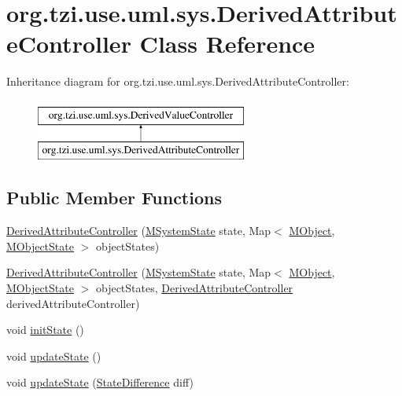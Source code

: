 \hypertarget{classorg_1_1tzi_1_1use_1_1uml_1_1sys_1_1_derived_attribute_controller}{\section{org.\-tzi.\-use.\-uml.\-sys.\-Derived\-Attribute\-Controller Class Reference}
\label{classorg_1_1tzi_1_1use_1_1uml_1_1sys_1_1_derived_attribute_controller}
}
Inheritance diagram for org.\-tzi.\-use.\-uml.\-sys.\-Derived\-Attribute\-Controller\-:\begin{figure}[H]
\begin{center}
\leavevmode
\includegraphics[height=2.000000cm]{classorg_1_1tzi_1_1use_1_1uml_1_1sys_1_1_derived_attribute_controller}
\end{center}
\end{figure}
\subsection*{Public Member Functions}
\begin{DoxyCompactItemize}
\item 
\hyperlink{classorg_1_1tzi_1_1use_1_1uml_1_1sys_1_1_derived_attribute_controller_aaf268d2296b70c626d8748aba489ce50}{Derived\-Attribute\-Controller} (\hyperlink{classorg_1_1tzi_1_1use_1_1uml_1_1sys_1_1_m_system_state}{M\-System\-State} state, Map$<$ \hyperlink{interfaceorg_1_1tzi_1_1use_1_1uml_1_1sys_1_1_m_object}{M\-Object}, \hyperlink{classorg_1_1tzi_1_1use_1_1uml_1_1sys_1_1_m_object_state}{M\-Object\-State} $>$ object\-States)
\item 
\hyperlink{classorg_1_1tzi_1_1use_1_1uml_1_1sys_1_1_derived_attribute_controller_a14d09fa0eb643e2de38cd729c9b67a65}{Derived\-Attribute\-Controller} (\hyperlink{classorg_1_1tzi_1_1use_1_1uml_1_1sys_1_1_m_system_state}{M\-System\-State} state, Map$<$ \hyperlink{interfaceorg_1_1tzi_1_1use_1_1uml_1_1sys_1_1_m_object}{M\-Object}, \hyperlink{classorg_1_1tzi_1_1use_1_1uml_1_1sys_1_1_m_object_state}{M\-Object\-State} $>$ object\-States, \hyperlink{classorg_1_1tzi_1_1use_1_1uml_1_1sys_1_1_derived_attribute_controller}{Derived\-Attribute\-Controller} derived\-Attribute\-Controller)
\item 
void \hyperlink{classorg_1_1tzi_1_1use_1_1uml_1_1sys_1_1_derived_attribute_controller_ac4e02a6f53b61d5feb62e9a82826fa24}{init\-State} ()
\item 
void \hyperlink{classorg_1_1tzi_1_1use_1_1uml_1_1sys_1_1_derived_attribute_controller_a88590c4012e23e52dde68c54fc3ac9b6}{update\-State} ()
\item 
void \hyperlink{classorg_1_1tzi_1_1use_1_1uml_1_1sys_1_1_derived_attribute_controller_aee4f80682417bbf325b926ac093feb11}{update\-State} (\hyperlink{classorg_1_1tzi_1_1use_1_1util_1_1soil_1_1_state_difference}{State\-Difference} diff)
\end{DoxyCompactItemize}


